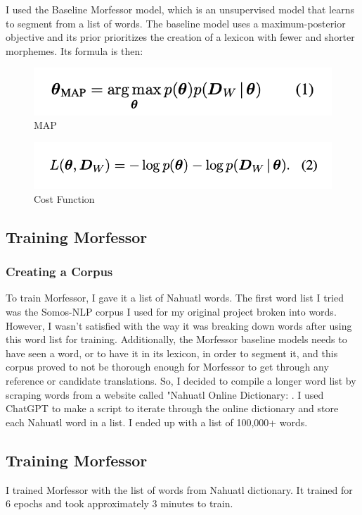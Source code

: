 \documentclass[10pt,twocolumn]{article}
\begin{document}
I used the Baseline Morfessor model, which is an unsupervised model that learns to segment from a list of words. The baseline model uses a maximum-posterior objective and its prior prioritizes the creation of a lexicon with fewer and shorter morphemes. Its formula is then: 
\begin{figure}
    \centering
    \includegraphics[width=.95\linewidth]{Morfessor1.png}
    \caption{ MAP
    }
    \label{fig:first-page}
\end{figure}

\begin{figure}
    \centering
    \includegraphics[width=.95\linewidth]{Morfessor2.png}
    \caption{ Cost Function
    }
    \label{fig:first-page}
\end{figure}

\subsection{Training Morfessor}
\subsubsection{Creating a Corpus}
To train Morfessor, I gave it a list of Nahuatl words. The first word list I tried was the Somos-NLP corpus I used for my original project broken into words. However, I wasn't satisfied with the way it was breaking down words after using this word list for training. Additionally, the Morfessor baseline models needs to have seen a word, or to have it in its lexicon, in order to segment it, and this corpus proved  to not be thorough enough for Morfessor to get through any  reference or candidate translations. 
So, I decided to compile a longer word list by scraping words from a website called "Nahuatl Online Dictionary: \cite{NahuatlDictionary}. I used ChatGPT to make a script to iterate through the online dictionary and store each Nahuatl word in a list. I ended up with a list of 100,000+ words.  

\subsection{Training Morfessor}
I trained Morfessor with the list of words from Nahuatl dictionary. It trained for 6 epochs and took approximately 3 minutes to train.
\end{document}
